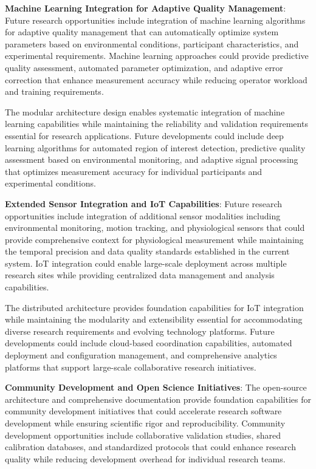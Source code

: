 \documentclass[11pt,a4paper]{article}
\begin{document}
\textbf{Machine Learning Integration for Adaptive Quality Management}: Future research opportunities include integration of
machine learning algorithms for adaptive quality management that can automatically optimize system parameters based on
environmental conditions, participant characteristics, and experimental requirements. Machine learning approaches could
provide predictive quality assessment, automated parameter optimization, and adaptive error correction that enhance
measurement accuracy while reducing operator workload and training requirements.

The modular architecture design enables systematic integration of machine learning capabilities while maintaining the
reliability and validation requirements essential for research applications. Future developments could include deep
learning algorithms for automated region of interest detection, predictive quality assessment based on environmental
monitoring, and adaptive signal processing that optimizes measurement accuracy for individual participants and
experimental conditions.

\textbf{Extended Sensor Integration and IoT Capabilities}: Future research opportunities include integration of additional
sensor modalities including environmental monitoring, motion tracking, and physiological sensors that could provide
comprehensive context for physiological measurement while maintaining the temporal precision and data quality standards
established in the current system. IoT integration could enable large-scale deployment across multiple research sites
while providing centralized data management and analysis capabilities.

The distributed architecture provides foundation capabilities for IoT integration while maintaining the modularity and
extensibility essential for accommodating diverse research requirements and evolving technology platforms. Future
developments could include cloud-based coordination capabilities, automated deployment and configuration management, and
comprehensive analytics platforms that support large-scale collaborative research initiatives.

\textbf{Community Development and Open Science Initiatives}: The open-source architecture and comprehensive documentation
provide foundation capabilities for community development initiatives that could accelerate research software
development while ensuring scientific rigor and reproducibility. Community development opportunities include
collaborative validation studies, shared calibration databases, and standardized protocols that could enhance research
quality while reducing development overhead for individual research teams.
\end{document}
